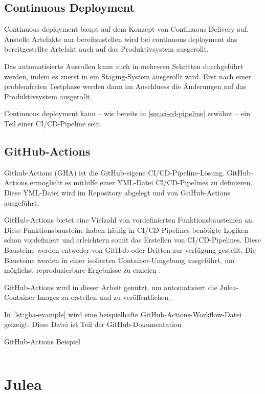 \subsection{Continuous Deployment}

Continuous deployment baupt auf dem Konzept von Continuous Delivery auf. Anstelle Artefakte nur bereitzustellen wird bei continuous deployment das bereitgestellte Artefakt auch auf das Produktivsystem ausgerollt.

Das automatisierte Ausrollen kann auch in mehreren Schritten durchgeführt werden, indem es zuerst in ein Staging-System ausgerollt wird. Erst nach einer problemfreien Testphase werden dann im Anschluess die Änderungen auf das Produktivsystem ausgerollt. 

Continuous deployment kann – wie bereits in \cref{sec:ci-cd-pipeline} erwähnt – ein Teil einer CI/CD-Pipeline sein.

\subsection{GitHub-Actions}

Github-Actions (GHA) ist die GitHub-eigene CI/CD-Pipeline-Lösung. GitHub-Actions ermöglicht es mithilfe einer YML-Datei CI/CD-Pipelines zu definieren. Diese YML-Datei wird im Repository abgelegt und von GitHub-Actions ausgeführt. 

GitHub-Actions bietet eine Vielzahl von vordefinierten Funktionsbausteinen an. Diese Funktionsbausteine haben häufig in CI/CD-Pipelines benötigte Logiken schon vordefiniert und erleichtern somit das Erstellen von CI/CD-Pipelines. Diese Bausteine werden entweder von GitHub oder Dritten zur verfügung gestellt. Die Bausteine werden in einer isolierten Container-Umgebung ausgeführt, um möglichst reproduzierbare Ergebnisse zu erzielen \cite{githubGitHubActions}.

GitHub-Actions wird in dieser Arbeit genutzt, um automatisiert die Julea-Container-Images zu erstellen und zu veröffentlichen.

In \cref{lst:gha-example} wird eine beispielhafte GitHub-Actions-Workflow-Datei geizeigt. Diese Datei ist Teil der GitHub-Dokumentation \cite{githubSchnellstartFuerGitHub}

\begin{listing}[H]
    \caption{GitHub-Actions Beispiel}
    \label{lst:gha-example}
    \inputminted{yaml}{./code-examples/gha.yml}
\end{listing}


\section{Julea}


